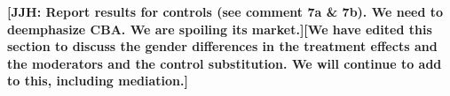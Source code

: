 \textbf{[JJH: Report results for controls (see comment 7a \& 7b). We need to deemphasize CBA. We are spoiling its market.][We have edited this section to discuss the gender differences in the treatment effects and the moderators and the control substitution. We will continue to add to this, including mediation.]}

%
%	

